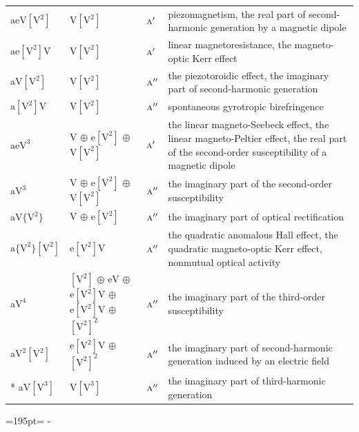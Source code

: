 \documentclass[10pt,a4paper]{article}
\newcommand{\needspace}[1]{\par\penalty-100\begingroup\dimen0=#1\relax\dimen2=\pagegoal
  \advance\dimen2-\pagetotal\ifdim\dimen0>\dimen2\relax\ifdim\dimen2>0pt\vfil\break\fi\fi
  \endgroup}
\numberwithin{equation}{section}
\newcommand{\irr}[1]{\text{\normalfont\scshape #1}}
\newcommand{\jahn}[1]{\mathrm{#1}}
\newlength{\fillwidth}\newlength{\cellwidth}\newlength{\colwidth}
\begin{document}
{\begin{longtable}{@{}lll>{\RaggedRight\arraybackslash}p{\fillwidth}@{}}
$\jahn{aeV[V^{2}]}$ & $\jahn{V[V^{2}]}$ & $\irr{a}'$ & piezomagnetism, the real part of second-harmonic generation by a magnetic dipole\\
$\jahn{ae[V^{2}]V}$ & $\jahn{V[V^{2}]}$ & $\irr{a}'$ & linear magnetoresistance, the magneto-optic Kerr effect\\
$\jahn{aV[V^{2}]}$ & $\jahn{V[V^{2}]}$ & $\irr{a}''$ & the piezotoroidic effect, the imaginary part of second-harmonic generation\\
$\jahn{a[V^{2}]V}$ & $\jahn{V[V^{2}]}$ & $\irr{a}''$ & spontaneous gyrotropic birefringence\\
$\jahn{aeV^{3}}$ & $\jahn{V}$ $\oplus$ $\jahn{e[V^{2}]}$ $\oplus$ $\jahn{V[V^{2}]}$ & $\irr{a}'$ & the linear magneto-Seebeck effect, the linear magneto-Peltier effect, the real part of the second-order susceptibility of a magnetic dipole\\
$\jahn{aV^{3}}$ & $\jahn{V}$ $\oplus$ $\jahn{e[V^{2}]}$ $\oplus$ $\jahn{V[V^{2}]}$ & $\irr{a}''$ & the imaginary part of the second-order susceptibility\\
$\jahn{aV\{V^{2}\}}$ & $\jahn{V}$ $\oplus$ $\jahn{e[V^{2}]}$ & $\irr{a}''$ & the imaginary part of optical rectification\\
$\jahn{a\{V^{2}\}[V^{2}]}$ & $\jahn{e[V^{2}]V}$ & $\irr{a}''$ & the quadratic anomalous Hall effect, the quadratic magneto-optic Kerr effect, nonmutual optical activity\\
$\jahn{aV^{4}}$ & $\jahn{[V^{2}]}$ $\oplus$ $\jahn{eV}$ $\oplus$ $\jahn{e[V^{2}]V}$ $\oplus$ $\jahn{e[V^{2}]V}$ $\oplus$ $\jahn{[V^{2}]^{2}}$ & $\irr{a}''$ & the imaginary part of the third-order susceptibility\\
$\jahn{aV^{2}[V^{2}]}$ & $\jahn{e[V^{2}]V}$ $\oplus$ $\jahn{[V^{2}]^{2}}$ & $\irr{a}''$ & the imaginary part of second-harmonic generation induced by an electric field\\*
$\jahn{aV[V^{3}]}$ & $\jahn{V[V^{3}]}$ & $\irr{a}''$ & the imaginary part of third-harmonic generation\\
\bottomrule\end{longtable}}
\needspace{195pt}
\end{document}

